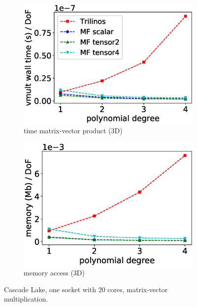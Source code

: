 \documentclass[AMA,STIX1COL]{WileyNJD-v2}
\begin{document}
\begin{figure}
\begin{subfigure}[b]{0.32\textwidth}
    \includegraphics[width=\textwidth]{CSL_Munich_timing3d.eps}
    \caption{time matrix-vector product (3D)}
    \label{fig:benchmark_miehe_CSL_vmult3}
  \end{subfigure}
  \begin{subfigure}[b]{0.32\textwidth}
    \centering
    \includegraphics[width=\textwidth]{CSL_Munich_memory3d-nolables.eps}
    \caption{memory access (3D)}
    \label{fig:benchmark_miehe_CSL_memory3}
  \end{subfigure}
  \caption{Cascade Lake, one socket with 20 cores, matrix-vector multiplication.}%
  \label{fig:benchmark_miehe_CSL}
\end{figure}
\end{document}
